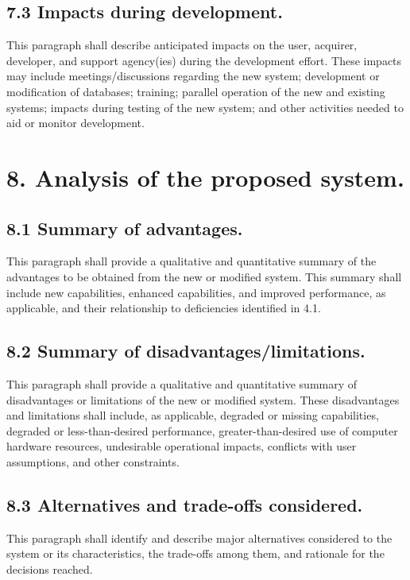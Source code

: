\subsection{7.3 Impacts during development.}

This paragraph shall describe anticipated impacts on the user, acquirer,
developer, and support agency(ies) during the development effort. These
impacts may include meetings/discussions regarding the new system;
development or modification of databases; training; parallel operation
of the new and existing systems; impacts during testing of the new
system; and other activities needed to aid or monitor development.

\section{8. Analysis of the proposed system.}

\subsection{8.1 Summary of advantages.}

This paragraph shall provide a qualitative and quantitative summary of
the advantages to be obtained from the new or modified system. This
summary shall include new capabilities, enhanced capabilities, and
improved performance, as applicable, and their relationship to
deficiencies identified in 4.1.

\subsection{8.2 Summary of disadvantages/limitations.}

This paragraph shall provide a qualitative and quantitative summary of
disadvantages or limitations of the new or modified system. These
disadvantages and limitations shall include, as applicable, degraded or
missing capabilities, degraded or less-than-desired performance,
greater-than-desired use of computer hardware resources, undesirable
operational impacts, conflicts with user assumptions, and other
constraints.

\subsection{8.3 Alternatives and trade-offs considered.}

This paragraph shall identify and describe major alternatives considered
to the system or its characteristics, the trade-offs among them, and
rationale for the decisions reached.

